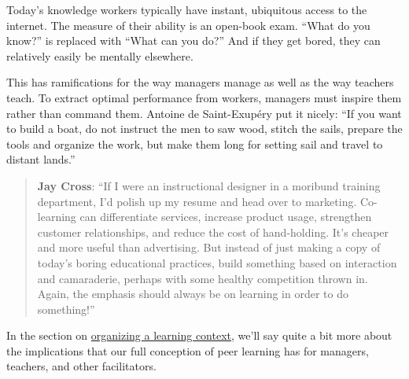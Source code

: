 Today's knowledge workers typically have instant, ubiquitous access to
the internet. The measure of their ability is an open-book exam. ``What
do you know?'' is replaced with ``What can you do?'' And if they get
bored, they can relatively easily be mentally elsewhere.

This has ramifications for the way managers manage as well as the way
teachers teach. To extract optimal performance from workers, managers
must inspire them rather than command them. Antoine de Saint-Exupéry put
it nicely: ``If you want to build a boat, do not instruct the men to saw
wood, stitch the sails, prepare the tools and organize the work, but
make them long for setting sail and travel to distant lands.''

\begin{quote}
\textbf{Jay Cross}: ``If I were an instructional designer in a moribund
training department, I'd polish up my resume and head over to marketing.
Co-learning can differentiate services, increase product usage,
strengthen customer relationships, and reduce the cost of hand-holding.
It's cheaper and more useful than advertising. But instead of just
making a copy of today's boring educational practices, build something
based on interaction and camaraderie, perhaps with some healthy
competition thrown in. Again, the emphasis should always be on learning
in order to do something!''
\end{quote}
In the section on \href{http://peeragogy.org/organize/}{organizing a
learning context}, we'll say quite a bit more about the implications
that our full conception of peer learning has for managers, teachers,
and other facilitators.
